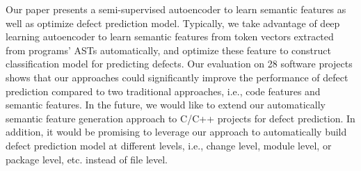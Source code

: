 
Our paper presents a semi-supervised autoencoder to learn semantic features as well as optimize defect prediction model. Typically, we take advantage of deep learning autoencoder to learn semantic features from token vectors extracted from programs' ASTs automatically, and optimize these feature to construct classification model for predicting defects. Our evaluation on 28 software projects shows that our approaches could significantly improve the performance of defect prediction compared to two traditional approaches, i.e., code features and semantic features. In the future, we would like to extend our automatically semantic feature generation approach to C/C++ projects for defect prediction. In addition, it would be promising to leverage our approach to automatically build defect prediction model at different levels, i.e., change level, module level, or package level, etc. instead of file level. 

%
